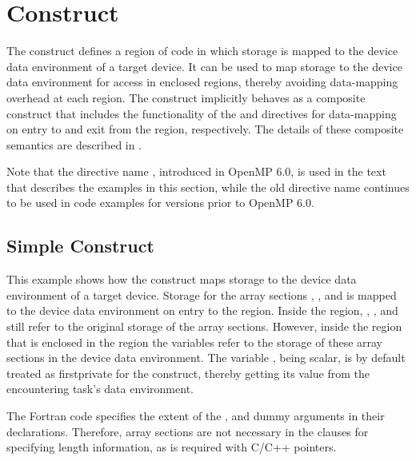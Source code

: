\section{ Construct}
\label{sec:target_data}

The  construct defines a region of code in which storage is
mapped to the device data environment of a target device. It can be used to map
storage to the device data environment for access in enclosed 
regions, thereby avoiding data-mapping overhead at each  region.
The  construct implicitly behaves as a composite construct
that includes the functionality of the  and
 directives for data-mapping on entry to and exit from
the region, respectively. The details of these composite semantics are described
in .

Note that the directive name , introduced in OpenMP 6.0, is
used in the text that describes the examples in this section, while the old
directive name  continues to be used in code examples for
versions prior to OpenMP 6.0.

\subsection{Simple  Construct}
\label{subsec:target_data_simple}

This example shows how the  construct maps storage to the
device data environment of a target device. Storage for the array sections
, , and  is mapped to the device data
environment on entry to the  region. Inside the
 region, , , and  still refer to
the original storage of the array sections. However, inside the
 region that is enclosed in the  region the
variables refer to the storage of these array sections in the device data
environment. The variable , being scalar, is by default treated as
firstprivate for the  construct, thereby getting its value from
the encountering task's data environment.



The Fortran code specifies the extent of the ,  and
 dummy arguments in their declarations. Therefore, array sections are
not necessary in the  clauses for specifying length information, as is
required with C/C++ pointers.

